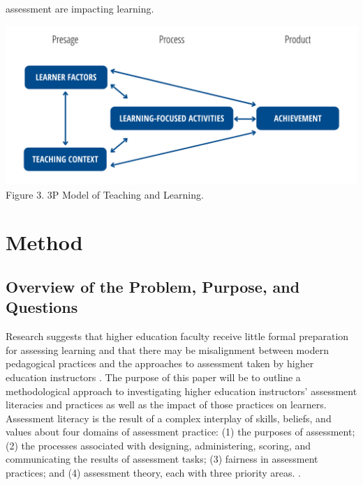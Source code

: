 \documentclass[
]{book}
\begin{document}
assessment are impacting learning.

\includegraphics{images/3p-model.png}
Figure 3. 3P Model of Teaching and Learning. \citep{biggsWhatStudentDoes1999, biggsTheoryPracticeCognitive1993}

\hypertarget{method}{%
\chapter*{Method}\label{method}}

\hypertarget{overview-of-the-problem-purpose-and-questions}{%
\section*{Overview of the Problem, Purpose, and Questions}\label{overview-of-the-problem-purpose-and-questions}}

Research suggests that higher education faculty receive little formal preparation for assessing learning \citep{lipnevichWhatGradesMean2020} and that there may be misalignment between modern pedagogical practices and the approaches to assessment taken by higher education instructors \citep{knightSummativeAssessmentHigher2002, masseyAssessmentLiteracyCollege2020, shepardRoleAssessmentLearning2000}. The purpose of this paper will be to outline a methodological approach to investigating higher education instructors' assessment literacies and practices as well as the impact of those practices on learners. Assessment literacy is the result of a complex interplay of skills, beliefs, and values about four domains of assessment practice: (1) the purposes of assessment; (2) the processes associated with designing, administering, scoring, and communicating the results of assessment tasks; (3) fairness in assessment practices; and (4) assessment theory, each with three priority areas. \citep{delucaDifferentialSituatedView2019}.
\end{document}
